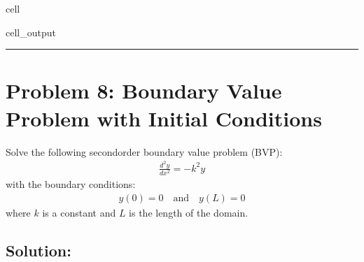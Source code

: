 \documentclass[letterpaper,10pt,english]{jupyterBook}
\begin{document}
\begin{sphinxuseclass}{cell}
\begin{sphinxVerbatimOutput}
\begin{sphinxuseclass}{cell_output}
\noindent{}

\end{sphinxuseclass}\end{sphinxVerbatimOutput}

\end{sphinxuseclass}

\bigskip\hrule\bigskip



\section{Problem 8: Boundary Value Problem with Initial Conditions}
\label{\detokenize{prerequisites:problem-8-boundary-value-problem-with-initial-conditions}}
\sphinxAtStartPar
Solve the following second\sphinxhyphen{}order boundary value problem (BVP):
\begin{equation*}
\begin{split}
\frac{d^2 y}{dx^2} = -k^2 y
\end{split}
\end{equation*}
\sphinxAtStartPar
with the boundary conditions:
\begin{equation*}
\begin{split}
y(0) = 0 \quad \text{and} \quad y(L) = 0
\end{split}
\end{equation*}
\sphinxAtStartPar
where \(k\) is a constant and \(L\) is the length of the domain.


\subsection{Solution:}
\label{\detokenize{prerequisites:id9}}
\end{document}
